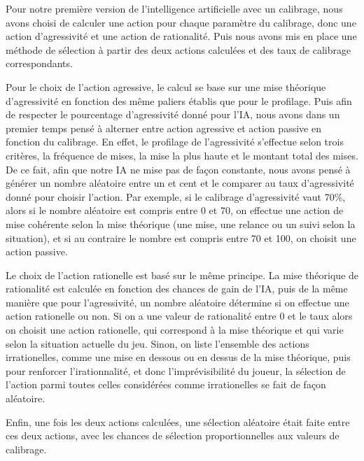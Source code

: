 \documentclass{report}
\begin{document}
Pour notre première version de l'intelligence artificielle avec un calibrage, nous avons choisi de calculer une action pour chaque paramètre du calibrage, donc une action d'agressivité et une action de rationalité. Puis nous avons mis en place une méthode de sélection à partir des deux actions calculées et des taux de calibrage correspondants.\par
Pour le choix de l'action agressive, le calcul se base sur une mise théorique d'agressivité en fonction des même paliers établis que pour le profilage. Puis afin de respecter le pourcentage d'agressivité donné pour l'IA, nous avons dans un premier temps pensé à alterner entre action agressive et action passive en fonction du calibrage. En effet, le profilage de l'agressivité s'effectue selon trois critères, la fréquence de mises, la mise la plus haute et le montant total des mises. De ce fait, afin que notre IA ne mise pas de façon constante, nous avons pensé à générer un nombre aléatoire entre un et cent et le comparer au taux d'agressivité donné pour choisir l'action. Par exemple, si le calibrage d'agressivité vaut 70\%, alors si le nombre aléatoire est compris entre 0 et 70, on effectue une action de mise cohérente selon la mise théorique (une mise, une relance ou un suivi selon la situation), et si au contraire le nombre est compris entre 70 et 100, on choisit une action passive.\par
Le choix de l'action rationelle est basé sur le même principe. La mise théorique de rationalité est calculée en fonction des chances de gain de l'IA, puis de la même manière que pour l'agressivité, un nombre aléatoire détermine si on effectue une action rationelle ou non. Si on a une valeur de rationalité entre 0 et le taux alors on choisit une action rationelle, qui correspond à la mise théorique et qui varie selon la situation actuelle du jeu. Sinon, on liste l'ensemble des actions irrationelles, comme une mise en dessous ou en dessus de la mise théorique, puis pour renforcer l'irationnalité, et donc l'imprévisibilité du joueur, la sélection de l'action parmi toutes celles considérées comme irrationelles se fait de façon aléatoire.\par
Enfin, une fois les deux actions calculées, une sélection aléatoire était faite entre ces deux actions, avec les chances de sélection proportionnelles aux valeurs de calibrage.\\
\end{document}
